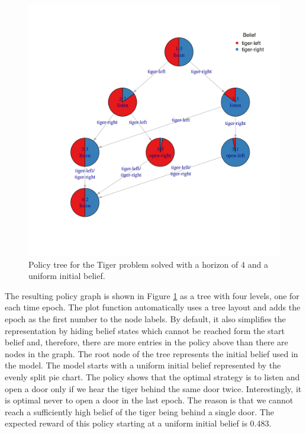 \begin{figure}
\includegraphics[width=1\linewidth]{pomdp_files/figure-latex/tiger-finite-horizon-1} \caption{Policy tree for the Tiger problem solved with a horizon of 4 and a uniform initial belief.}\label{fig:tiger-finite-horizon}
\end{figure}

The resulting policy graph is shown in Figure \ref{fig:tiger-finite-horizon}
as a tree with four levels, one for each time epoch. The plot function automatically
uses a tree layout and adds the epoch as the first number to the node labels. By default,
it also simplifies the representation by hiding belief states which cannot be reached
form the start belief and, therefore, there are more entries in the policy above
than there are nodes in the graph.
The root node of the tree represents the initial belief
used in the model. The model starts with a uniform initial belief represented by the evenly split pie chart.
The policy shows that
the optimal strategy is
to listen and open a door only if we hear the tiger behind the same door twice.
Interestingly, it is optimal never to open a door in
the last epoch. The reason is that we cannot reach a sufficiently high belief of the tiger being behind a single door.
The expected reward of this policy starting at a uniform initial belief is
0.483.

